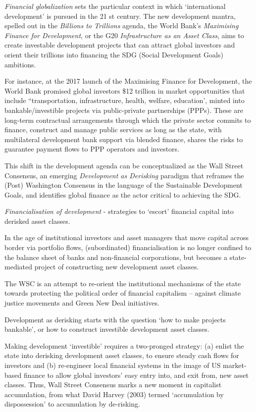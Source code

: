 \documentclass[
]{book}
\begin{document}
\emph{Financial globalization} sets the particular context in which
`international development' is pursued in the 21 st century.
The new development mantra, spelled out in the \emph{Billions to Trillions} agenda, the World
Bank's \emph{Maximising Finance for Development}, or the G20 \emph{Infrastructure as an Asset
Class}, aims to create investable development projects that can attract global investors
and orient their trillions into financing the SDG (Social Development Goals) ambitions.

For instance, at the 2017
launch of the Maximising Finance for Development, the World Bank promised global
investors \$12 trillion in market opportunities that include ``transportation,
infrastructure, health, welfare, education', minted into bankable/investible projects via
public-private partnerships (PPPs). These are long-term contractual arrangements
through which the private sector commits to finance, construct and manage public
services as long as the state, with multilateral development bank support via blended
finance, shares the risks to guarantee payment flows to PPP operators and investors.

This shift in the development agenda can be conceptualized as the Wall Street
Consensus, an emerging \emph{Development as Derisking} paradigm that reframes the (Post)
Washington Consensus in the language of the Sustainable
Development Goals, and identifies global finance as the actor critical to achieving the
SDG.

\emph{Financialisation of development} - strategies to `escort' financial capital
into derisked asset classes.

In the age of institutional investors
and asset managers that move capital across border via portfolio flows, (subordinated)
financialisation is no longer confined to the balance sheet of banks and non-financial
corporations, but becomes a state-mediated project of constructing new development
asset classes.

The WSC is an attempt to re-orient the institutional mechanisms of
the state towards protecting the political order of financial capitalism --
against climate justice movements and Green New Deal initiatives.

Development as derisking starts with the question `how to make projects bankable', or
how to construct investible development asset classes.

Making development `investible' requires a two-pronged strategy: (a) enlist the state
into derisking development asset classes, to ensure steady cash flows for investors and
(b) re-engineer local financial systems in the image of US market-based finance to
allow global investors' easy entry into, and exit from, new asset classes. Thus, Wall
Street Consensus marks a new moment in capitalist accumulation, from what David
Harvey (2003) termed `accumulation by dispossession' to accumulation by de-risking.
\end{document}
